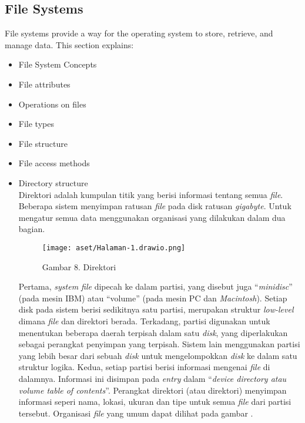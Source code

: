\documentclass[12pt]{article}
\begin{document}
	\subsection{File Systems}
	File systems provide a way for the operating system to store, retrieve, and manage data. This section explains:
	\begin{itemize}
		\item File System Concepts
		\item File attributes
		\item Operations on files
		\item File types
		\item File structure
		\item File access methods
		\item Directory structure
			\\Direktori adalah kumpulan titik yang berisi informasi tentang semua \textit{file}. Beberapa sistem menyimpan ratusan \textit{file} pada disk ratusan \textit{gigabyte}. Untuk mengatur semua data menggunakan organisasi yang dilakukan dalam dua bagian.
	
	\begin{figure}[h!]
		\centering
		\texttt{[image: aset/Halaman-1.drawio.png]}
		\captionsetup{labelformat=empty}
		\caption{Gambar 8. Direktori}
	\end{figure}
	
	Pertama,\textit{ system file} dipecah ke dalam partisi, yang disebut juga “\textit{minidisc}” (pada mesin IBM) atau “volume” (pada mesin PC dan \textit{Macintosh}). Setiap disk pada sistem berisi sedikitnya satu partisi, merupakan struktur \textit{low-level} dimana \textit{file} dan direktori berada. Terkadang, partisi digunakan untuk menentukan beberapa daerah terpisah dalam satu \textit{disk}, yang diperlakukan sebagai perangkat penyimpan yang terpisah. Sistem lain menggunakan partisi yang lebih besar dari sebuah \textit{disk} untuk mengelompokkan \textit{disk} ke dalam satu struktur logika. Kedua, setiap partisi berisi informasi mengenai \textit{file }di dalamnya. Informasi ini disimpan pada\textit{ entry }dalam “\textit{device directory atau volume table of contents}”. Perangkat direktori (atau direktori) menyimpan informasi seperi nama, lokasi, ukuran dan tipe untuk semua\textit{ file} dari partisi tersebut. Organisasi \textit{file} yang umum dapat dilihat pada gambar .
	

\end{itemize}
\end{document}
